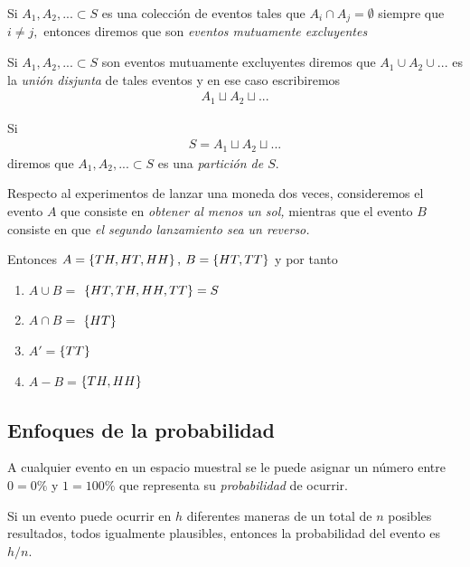 \begin{definicion}
	Si $A_{1},A_{2},... \subset S$ es una colección de eventos tales que $A_{i}\cap A_{j}=\emptyset$ siempre que $i\neq j,$ entonces diremos que son \emph{eventos mutuamente excluyentes}
\end{definicion}

\begin{definicion}
	Si $A_{1}, A_{2}, ...\subset S$ son eventos mutuamente excluyentes diremos que $A_{1} \cup A_{2} \cup ... $ es la \emph{unión disjunta} de tales eventos y en ese caso escribiremos
	\begin{align}
		A_{1}\sqcup A_{2} \sqcup ...
	\end{align}
\end{definicion}


\begin{definicion}
	Si \begin{align}
		S=A_{1}\sqcup A_{2} \sqcup ...
	\end{align}
	diremos que $A_{1},A_{2},...\subset S$  es una \emph{partición de $S.$}
\end{definicion}


\begin{ejemplo}
	\label{exmp:2.2.9}
	Respecto al experimentos de lanzar una moneda dos veces, consideremos el evento $A$ que consiste en \emph{obtener al menos un sol,}  mientras que el evento $B$ consiste en que \emph{el segundo lanzamiento sea un reverso.}
	
	Entonces $A=\left\{ TH,HT,HH \right\},$ $B=\left\{ HT,TT \right\}$ y por tanto 
	\begin{enumerate}
		\item $A\cup B =$ $\left\{ HT,TH,HH,TT \right\}= S$ 
		\item $A\cap B =$ $\left\{ HT \right\}$ 
		\item $A'=$$\left\{ TT \right\}$
		\item $A-B=$$\left\{ TH,HH \right\}$
	\end{enumerate}
	
\end{ejemplo}


\subsection{Enfoques de la probabilidad}

A cualquier evento en un espacio muestral se le puede asignar un número entre $0=0\%$ y $1=100\%$ que representa su \emph{probabilidad} de ocurrir.


Si un evento puede ocurrir en $h$ diferentes maneras de un total de $n$ posibles resultados, todos igualmente plausibles, entonces la probabilidad del evento es $h/n.$


